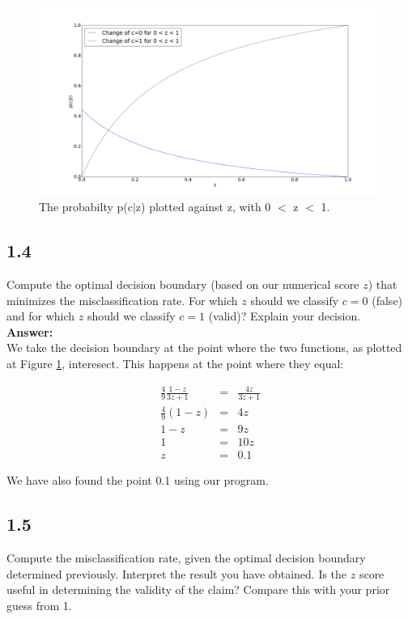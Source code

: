 \documentclass[a4paper]{article}
\begin{document}
\begin{figure}[H]
\includegraphics[width=\textwidth]{Exercise1,3.png}
\caption{ The probabilty p(c$|$z) plotted against z, with 0 $<$ z $<$ 1.}
\label{Fig1.3}
\end{figure}


\subsection*{1.4}

Compute the optimal decision boundary (based on our numerical score $z$) that minimizes the misclassification rate. For which $z$ should we classify $c = 0$ (false) and for which $z$ should we classify $c = 1$ (valid)? Explain your decision.\\


\textbf{Answer:}\\


We take the decision boundary at the point where the two functions, as plotted at Figure \ref{Fig1.3}, interesect. This happens at the point where they equal:

\begin{eqnarray}
\frac{4}{9} \frac{1-z	}{3z+1} &=& \frac{4z}{3z+1}\\
\frac{4}{9}(1-z) &=& 4z\\
1-z &=& 9z\\
1 &=& 10z\\
z &=& 0.1
\end{eqnarray}

We have also found the point 0.1 using our program.


\subsection*{1.5}

Compute the misclassification rate, given the optimal decision boundary determined previously. Interpret the result you have obtained. Is the $z$ score useful in determining the validity of the claim? Compare this with your prior guess from 1.\\
\end{document}
